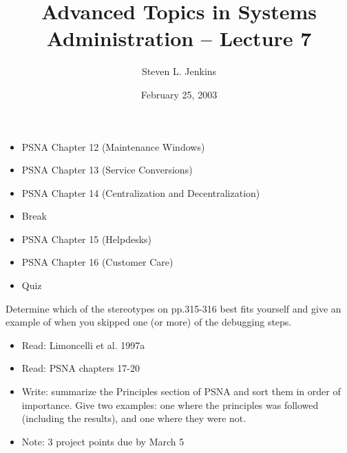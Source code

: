 \documentclass{slides}
\title{Advanced Topics in Systems Administration -- Lecture 7}
\author{Steven L. Jenkins}
\date{February 25, 2003}
\newcommand{\bi}{\begin{itemize}}
\newcommand{\ei}{\end{itemize}}
\begin{document}
\maketitle


\bi
\item PSNA Chapter 12 (Maintenance Windows)
\item PSNA Chapter 13 (Service Conversions)
\item PSNA Chapter 14 (Centralization and Decentralization)
\item Break
\item PSNA Chapter 15 (Helpdesks)
\item PSNA Chapter 16 (Customer Care)
\item Quiz
\ei


Determine which of the stereotypes on pp.315-316 best fits yourself and  
give an example of when you skipped one (or more) of the debugging steps.  


\bi
\item Read: Limoncelli et al. 1997a
\item Read: PSNA chapters 17-20
\item Write: summarize the Principles section of PSNA and
	sort them in order of importance.  Give two
	examples: one where the principles was followed
	(including the results), and one where they were not.
\item Note: 3 project points due by March 5
\ei
\end{document}
